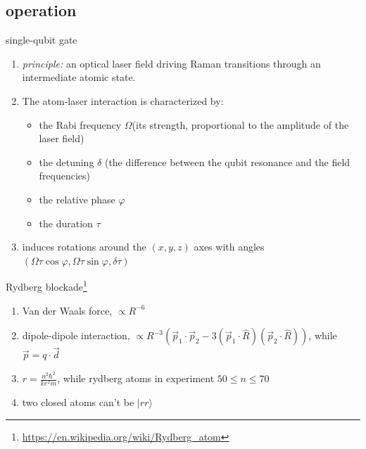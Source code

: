 \documentclass[18 pt]{beamer}
\begin{document}
\subsection{operation}
\begin{frame}{single-qubit gate}
  \begin{enumerate}[itemsep=10pt]
    \item \textit{principle:} an optical laser field driving Raman transitions through an intermediate atomic state.
    \item The atom-laser interaction is characterized by:
    \begin{itemize}[itemsep = 5pt]
      \item the Rabi frequency \(\Omega\)(its strength, proportional to the amplitude of the laser field)
      \item the detuning \(\delta\) (the difference between the qubit resonance and the field frequencies) 
      \item the relative phase \(\varphi\)
      \item the duration \(\tau \)
    \end{itemize}
    \item induces rotations around the \((x,y,z)\) axes with angles \((\Omega\tau\cos{\varphi},\Omega\tau\sin{\varphi},\delta\tau)\)
  \end{enumerate}
\end{frame}
\begin{frame}{Rydberg blockade\footnote{\url{https://en.wikipedia.org/wiki/Rydberg_atom}}}
  \begin{enumerate}
    \item Van der Waals force, \(\propto R^{-6}\)
    \item dipole-dipole interaction, \(\propto R^{-3} \left( \vec{p}_1 \cdot \vec{p}_2 - 3(\vec{p}_1 \cdot \hat{R})(\vec{p}_2 \cdot \hat{R}) \right)
    \), while \(\vec{p} = q\cdot \vec{d}\)
    \item $r=\frac{n^{2}\hbar ^{2}}{ke^{2}m}$, while rydberg atoms in experiment $50\le n \le 70$
    \item two closed atoms can't be $|rr\rangle$
  \end{enumerate}
\end{frame}
\end{document}
